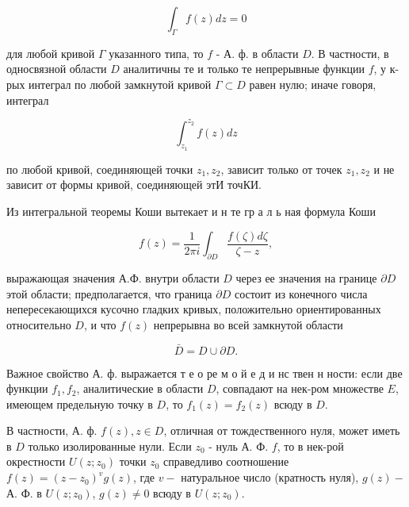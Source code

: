 \documentclass[10pt]{article}
\begin{document}
\[

\int_{\Gamma} f(z) d z=0

\]



для любой кривой $\Gamma$ указанного типа, то $f$ - А. ф. в области $D$. В частности, в односвязной области $D$ аналитичны те и только те непрерывные функции $f$, у к-рых интеграл по любой замкнутой кривой $\Gamma \subset D$ равен нулю; иначе говоря, интеграл



\[

\int_{z_{1}}^{z_{2}} f(z) d z

\]



по любой кривой, соединяющей точки $z_{1}, z_{2}$, зависит только от точек $z_{1}, z_{2}$ и не зависит от формы кривой, соединяющей этИ точКИ.



Из интегральной теоремы Коши вытекает и н те гр а л ь ная формула Коши



\[

f(z)=\frac{1}{2 \pi i} \int_{\partial D} \frac{f(\zeta) d \zeta}{\zeta-z},

\]



выражающая значения А.Ф. внутри области $D$ через ее значения на границе $\partial D$ этой области; предполагается, что граница $\partial D$ состоит из конечного числа непересекающихся кусочно гладких кривых, положительно ориентированных относительно $D$, и что $f(z)$ непрерывна во всей замкнутой области



\[

\bar{D}=D \cup \partial D .

\]



Важное свойство А. ф. выражается т е о ре м о й е д и нс твен н ности: если две функции $f_{1}, f_{2}$, аналитические в области $D$, совпадают на нек-ром множестве $E$, имеющем предельную точку в $D$, то $f_{1}(z)=f_{2}(z)$ всюду в $D$.



В частности, А. ф. $f(z), z \in D$, отличная от тождественного нуля, может иметь в $D$ только изолированные нули. Если $z_{0}$ - нуль А. Ф. $f$, то в нек-рой окрестности $U\left(z ; z_{0}\right)$ точки $z_{0}$ справедливо соотношение $f(z)=\left(z-z_{0}\right)^{v} g(z)$, где $v-$ натуральное число (кратность нуля), $g(z)-$ А. Ф. в $U\left(z ; z_{0}\right)$, $g(z) \neq 0$ всюду в $U\left(z ; z_{0}\right)$.
\end{document}
